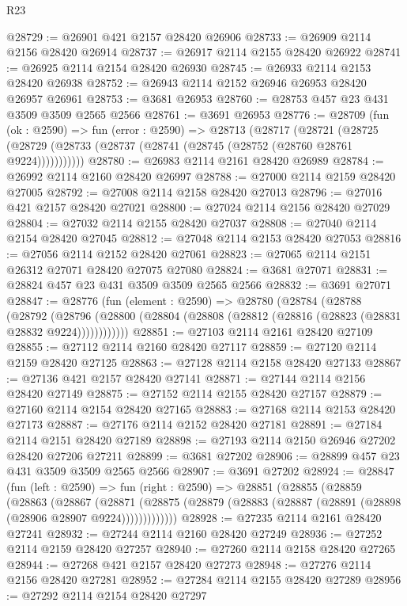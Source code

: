 \begin{lexlean}{R23}
\begin{coremodule}
@28729 := @26901 @421 @2157 @28420 @26906
@28733 := @26909 @2114 @2156 @28420 @26914
@28737 := @26917 @2114 @2155 @28420 @26922
@28741 := @26925 @2114 @2154 @28420 @26930
@28745 := @26933 @2114 @2153 @28420 @26938
@28752 := @26943 @2114 @2152 @26946 @26953 @28420 @26957 @26961
@28753 := @3681 @26953
@28760 := @28753 @457 @23 @431 @3509 @3509 @2565 @2566
@28761 := @3691 @26953
@28776 := @28709
    (fun (ok : @2590) =>
    fun (error : @2590) =>
    @28713
      (@28717
        (@28721
          (@28725 (@28729 (@28733 (@28737 (@28741 (@28745 (@28752 (@28760 @28761 @9224)))))))))))
@28780 := @26983 @2114 @2161 @28420 @26989
@28784 := @26992 @2114 @2160 @28420 @26997
@28788 := @27000 @2114 @2159 @28420 @27005
@28792 := @27008 @2114 @2158 @28420 @27013
@28796 := @27016 @421 @2157 @28420 @27021
@28800 := @27024 @2114 @2156 @28420 @27029
@28804 := @27032 @2114 @2155 @28420 @27037
@28808 := @27040 @2114 @2154 @28420 @27045
@28812 := @27048 @2114 @2153 @28420 @27053
@28816 := @27056 @2114 @2152 @28420 @27061
@28823 := @27065 @2114 @2151 @26312 @27071 @28420 @27075 @27080
@28824 := @3681 @27071
@28831 := @28824 @457 @23 @431 @3509 @3509 @2565 @2566
@28832 := @3691 @27071
@28847 := @28776
    (fun (element : @2590) =>
    @28780
      (@28784
        (@28788
          (@28792
            (@28796 (@28800 (@28804 (@28808 (@28812 (@28816 (@28823 (@28831 @28832 @9224))))))))))))
@28851 := @27103 @2114 @2161 @28420 @27109
@28855 := @27112 @2114 @2160 @28420 @27117
@28859 := @27120 @2114 @2159 @28420 @27125
@28863 := @27128 @2114 @2158 @28420 @27133
@28867 := @27136 @421 @2157 @28420 @27141
@28871 := @27144 @2114 @2156 @28420 @27149
@28875 := @27152 @2114 @2155 @28420 @27157
@28879 := @27160 @2114 @2154 @28420 @27165
@28883 := @27168 @2114 @2153 @28420 @27173
@28887 := @27176 @2114 @2152 @28420 @27181
@28891 := @27184 @2114 @2151 @28420 @27189
@28898 := @27193 @2114 @2150 @26946 @27202 @28420 @27206 @27211
@28899 := @3681 @27202
@28906 := @28899 @457 @23 @431 @3509 @3509 @2565 @2566
@28907 := @3691 @27202
@28924 := @28847
    (fun (left : @2590) =>
    fun (right : @2590) =>
    @28851
      (@28855
        (@28859
          (@28863
            (@28867
              (@28871
                (@28875 (@28879 (@28883 (@28887 (@28891 (@28898 (@28906 @28907 @9224)))))))))))))
@28928 := @27235 @2114 @2161 @28420 @27241
@28932 := @27244 @2114 @2160 @28420 @27249
@28936 := @27252 @2114 @2159 @28420 @27257
@28940 := @27260 @2114 @2158 @28420 @27265
@28944 := @27268 @421 @2157 @28420 @27273
@28948 := @27276 @2114 @2156 @28420 @27281
@28952 := @27284 @2114 @2155 @28420 @27289
@28956 := @27292 @2114 @2154 @28420 @27297

\end{coremodule}
\end{lexlean}
